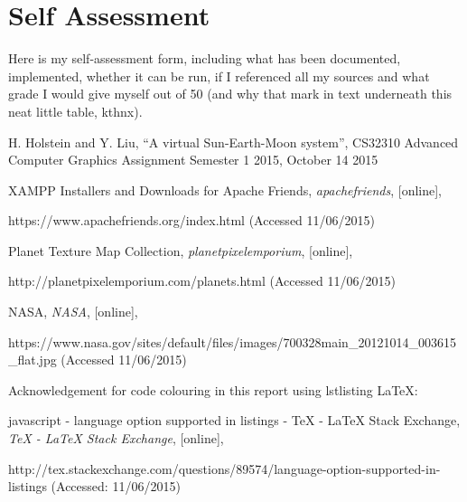 \documentclass[12pt]{article}
\begin{document}
\clearpage

\section{Self Assessment}
Here is my self-assessment form, including what has been documented, implemented, whether it can be run, if I referenced all my sources and what grade I would give myself out of 50 (and why that mark in text underneath this neat little table, kthnx).


\clearpage


\begin{thebibliography}{5}

 H. Holstein and Y. Liu, ``A virtual Sun-Earth-Moon system'', CS32310 Advanced Computer Graphics Assignment Semester 1 2015, October 14 2015

 XAMPP Installers and Downloads for Apache Friends, {\em apachefriends}, [online], 

https://www.apachefriends.org/index.html (Accessed 11/06/2015)

 Planet Texture Map Collection, {\em planetpixelemporium}, [online],

http://planetpixelemporium.com/planets.html (Accessed 11/06/2015)

 NASA, {\em NASA}, [online], 

https://www.nasa.gov/sites/default/files/images/700328main\_20121014\_003615\_flat.jpg (Accessed 11/06/2015)

  Acknowledgement for code colouring in this report using lstlisting LaTeX: 

javascript - language option supported in listings - TeX - LaTeX Stack Exchange, {\em TeX - LaTeX Stack Exchange}, [online],

  http://tex.stackexchange.com/questions/89574/language-option-supported-in-listings (Accessed: 11/06/2015)

\end{thebibliography}
\end{document}
